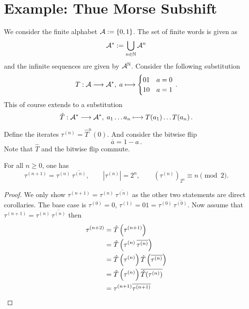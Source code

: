 \section{Example: Thue Morse Subshift}

We consider the finite alphabet $\mathcal{A} := \{ 0, 1 \}$.
The set of finite words is given as
\[ \mathcal{A}^* := \bigcup_{n\in\mathbb{N}} \mathcal{A}^n \]
and the infinite sequences are given by $\mathcal{A}^{\mathbb{N}}$.
Consider the following substitution
\[ T: \mathcal{A} \longrightarrow \mathcal{A}^*,\; a \longmapsto	\begin{cases} 01 & a=0 \\ 10 & a=1 \end{cases} \,.\]
This of course extends to a substitution
\[ \hat T: \mathcal{A}^* \longrightarrow \mathcal{A}^*,\; a_1\ldots a_n \longmapsto	T(a_1)\ldots T(a_n) \,. \]

Define the iterates $\tau^{(n)} = {\hat T}^n(0)$.
And consider the bitwise flip
\[ \overline{a} = 1-a \,.\]
Note that $\hat T$ and the bitwise flip commute.

\begin{lemma}
	\label{lem:tm-recursion}
	For all $n \geqslant 0$, one has
	\[
	\tau^{(n+1)} = \tau^{(n)}\,\overline{\tau^{(n)}},
	\qquad |\tau^{(n)}|=2^n,
	\qquad (\tau^{(n)})_{2^n}\equiv n\pmod2.
	\]
\end{lemma}
\begin{proof}
	We only show $\tau^{(n+1)} = \tau^{(n)}\,\overline{\tau^{(n)}}$ as the other two statements are direct corollaries.
	The base case is $\tau^{(0)}=0$, $\tau^{(1)}=01=\tau^{(0)}\,\overline{\tau^{(0)}}$.
	Now assume that 
	$\tau^{(n+1)} = \tau^{(n)}\,\overline{\tau^{(n)}}$
	then
	\begin{align*}
		\tau^{(n+2)} &= \hat T\left(\tau^{(n+1)}\right)\\
		&= \hat T\left( \tau^{(n)}\,\overline{\tau^{(n)}}\right)\\
		&= \hat T\left( \tau^{(n)} \right) \hat T\left(\overline{\tau^{(n)}}\right)\\
		&= \hat T\left( \tau^{(n)} \right) \overline{\hat T(\tau^{(n)})}\\
		&= \tau^{(n+1)} \overline{\tau^{(n+1)}} \qedhere
	\end{align*}
\end{proof}

